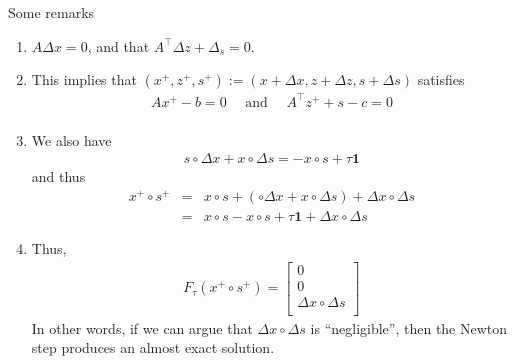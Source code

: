 	Some remarks
	\begin{enumerate}
	\item $A \Delta x= 0$, and that $A^{\top} \Delta z + \Delta_s = 0$.
	\item This implies that $(x^+,z^+,s^+) := (x  + \Delta x, z+ \Delta z, s + \Delta s)$ satisfies
	\begin{eqnarray*}
	Ax^+ - b = 0\quad  \text{ and } \quad A^{\top} z^+ + s - c = 0\\
	\end{eqnarray*}
	\item We also have
	\begin{eqnarray*}
	s \circ \Delta x + x \circ \Delta s = - x \circ s + \tau \mathbf{1}
	\end{eqnarray*}
	and thus
	\begin{eqnarray*}
	x^+ \circ s^+ &=& x\circ s + \left( \circ \Delta x + x \circ \Delta s\right) + \Delta x \circ \Delta s\\
	 &=&  x \circ s - x \circ s + \tau \mathbf{1} + \Delta  x \circ \Delta s
	\end{eqnarray*}
	\item Thus, 
	\begin{eqnarray*}
	F_{\tau}(x^+\circ s^+) = \begin{bmatrix} 0 \\
	0 \\
	\Delta  x \circ \Delta s \\
	\end{bmatrix}
	\end{eqnarray*}
	In other words, if we can argue that $\Delta x \circ \Delta s$ is ``negligible'', then the Newton step produces an almost exact solution. 
	\end{enumerate}

